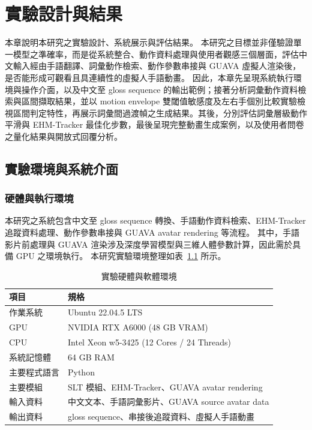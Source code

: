 \documentclass[class=NCU_thesis, crop=false]{standalone}
\begin{document}
\chapter{實驗設計與結果}

本章說明本研究之實驗設計、系統展示與評估結果。
本研究之目標並非僅驗證單一模型之準確率，而是從系統整合、動作資料處理與使用者觀感三個層面，評估中文輸入經由手語翻譯、詞彙動作檢索、動作參數串接與 GUAVA 虛擬人渲染後，是否能形成可觀看且具連續性的虛擬人手語動畫。
因此，本章先呈現系統執行環境與操作介面，以及中文至 gloss sequence 的輸出範例；接著分析詞彙動作資料檢索與區間擷取結果，並以 motion envelope 雙閾值敏感度及左右手個別比較實驗檢視區間判定特性，再展示詞彙間過渡幀之生成結果。其後，分別評估詞彙層級動作平滑與 EHM-Tracker 最佳化步數，最後呈現完整動畫生成案例，以及使用者問卷之量化結果與開放式回覆分析。

\section{實驗環境與系統介面}
\label{sec:exp_environment_ui}

\subsection{硬體與執行環境}

本研究之系統包含中文至 gloss sequence 轉換、手語動作資料檢索、EHM-Tracker 追蹤資料處理、動作參數串接與 GUAVA avatar rendering 等流程。
其中，手語影片前處理與 GUAVA 渲染涉及深度學習模型與三維人體參數計算，因此需於具備 GPU 之環境執行。
本研究實驗環境整理如表~\ref{tab:experiment_environment} 所示。

\begin{table}[H]
\centering
\caption{實驗硬體與軟體環境}
\label{tab:experiment_environment}
\begin{tabular}{ll}
\toprule
項目 & 規格 \\
\midrule
作業系統 & Ubuntu 22.04.5 LTS \\
GPU & NVIDIA RTX A6000 (48 GB VRAM) \\
CPU & Intel Xeon w5-3425 (12 Cores / 24 Threads) \\
系統記憶體 & 64 GB RAM \\
主要程式語言 & Python \\
主要模組 & SLT 模組、EHM-Tracker、GUAVA avatar rendering \\
輸入資料 & 中文文本、手語詞彙影片、GUAVA source avatar data \\
輸出資料 & gloss sequence、串接後追蹤資料、虛擬人手語動畫 \\
\bottomrule
\end{tabular}
\end{table}
\end{document}
